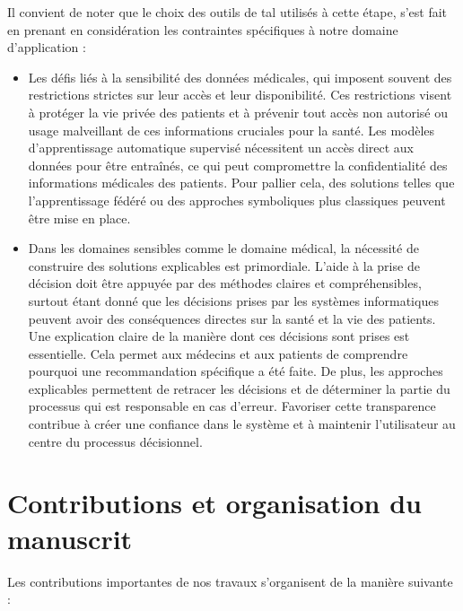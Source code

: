 Il convient de noter que le choix des outils de \gls{tal} utilisés à cette étape, s'est fait en prenant en considération les contraintes spécifiques à notre domaine d'application :
\begin{itemize}
    \item Les défis liés à la sensibilité des données médicales, qui imposent souvent des restrictions strictes sur leur accès et leur disponibilité.
    Ces restrictions visent à protéger la vie privée des patients et à prévenir tout accès non autorisé ou usage malveillant de ces informations cruciales pour la santé.
    Les modèles d'apprentissage automatique supervisé nécessitent un accès direct aux données pour être entraînés, ce qui peut compromettre la confidentialité des informations médicales des patients.
    Pour pallier cela, des solutions telles que l'apprentissage fédéré ou des approches symboliques plus classiques peuvent être mise en place.

    \item Dans les domaines sensibles comme le domaine médical, la nécessité de construire des solutions explicables est primordiale.
    L'aide à la prise de décision doit être appuyée par des méthodes claires et compréhensibles, surtout étant donné que les décisions prises par les systèmes informatiques peuvent avoir des conséquences directes sur la santé et la vie des patients.
    Une explication claire de la manière dont ces décisions sont prises est essentielle.
    Cela permet aux médecins et aux patients de comprendre pourquoi une recommandation spécifique a été faite.
    De plus, les approches explicables permettent de retracer les décisions et de déterminer la partie du processus qui est responsable en cas d'erreur.
    Favoriser cette transparence contribue à créer une confiance dans le système et à maintenir l'utilisateur au centre du processus décisionnel.
\end{itemize}

\FloatBarrier
\section{Contributions et organisation du manuscrit}

\noindent
Les contributions importantes de nos travaux s'organisent de la manière suivante :

